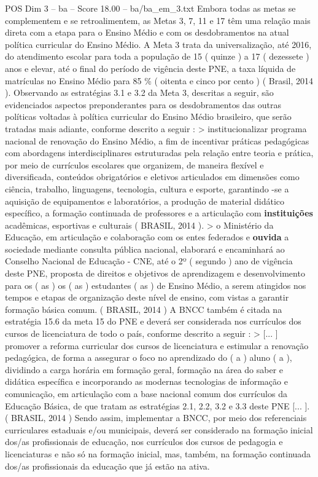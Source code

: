 \begin{textsample}{POS Dim 3 – ba – Score 18.00 – ba/ba\_em\_3.txt}
Embora todas as metas se complementem e se retroalimentem, as Metas 3, 7, 11 e 17 têm uma relação mais direta com a etapa para o Ensino Médio e com os desdobramentos na atual política curricular do Ensino Médio.
A Meta 3 trata da universalização, até 2016, do atendimento escolar para toda a população de 15 ( quinze ) a 17 ( dezessete ) anos e elevar, até o final do período de vigência deste PNE, a taxa líquida de matrículas no Ensino Médio para 85 \% ( oitenta e cinco por cento ) ( Brasil, 2014 ).
Observando as estratégias 3.1 e 3.2 da Meta 3, descritas a seguir, são evidenciados aspectos preponderantes para os desdobramentos das outras políticas voltadas à política curricular do Ensino Médio brasileiro, que serão tratadas mais adiante, conforme descrito a seguir : > institucionalizar programa nacional de renovação do Ensino Médio, a fim de incentivar práticas pedagógicas com abordagens interdisciplinares estruturadas pela relação entre teoria e prática, por meio de currículos escolares que organizem, de maneira flexível e diversificada, conteúdos obrigatórios e eletivos articulados em dimensões como ciência, trabalho, linguagens, tecnologia, cultura e esporte, garantindo -se a aquisição de equipamentos e laboratórios, a produção de material didático específico, a formação continuada de professores e a articulação com \textbf{instituições} acadêmicas, esportivas e culturais ( BRASIL, 2014 ). > o Ministério da Educação, em articulação e colaboração com os entes federados e \textbf{ouvida} a sociedade mediante consulta pública nacional, elaborará e encaminhará ao Conselho Nacional de Educação - CNE, até o 2º ( segundo ) ano de vigência deste PNE, proposta de direitos e objetivos de aprendizagem e desenvolvimento para os ( as ) os ( as ) estudantes ( as ) de Ensino Médio, a serem atingidos nos tempos e etapas de organização deste nível de ensino, com vistas a garantir formação básica comum. ( BRASIL, 2014 ) A BNCC também é citada na estratégia 15.6 da meta 15 do PNE e deverá ser considerada nos currículos dos cursos de licenciatura de todo o país, conforme descrito a seguir : > [... ] promover a reforma curricular dos cursos de licenciatura e estimular a renovação pedagógica, de forma a assegurar o foco no aprendizado do ( a ) aluno ( a ), dividindo a carga horária em formação geral, formação na área do saber e didática específica e incorporando as modernas tecnologias de informação e comunicação, em articulação com a base nacional comum dos currículos da Educação Básica, de que tratam as estratégias 2.1, 2.2, 3.2 e 3.3 deste PNE [... ]. ( BRASIL, 2014 ) Sendo assim, implementar a BNCC, por meio dos referenciais curriculares estaduais e/ou municipais, deverá ser considerado na formação inicial dos/as profissionais de educação, nos currículos dos cursos de pedagogia e licenciaturas e não só na formação inicial, mas, também, na formação continuada dos/as profissionais da educação que já estão na ativa.

\end{textsample}
